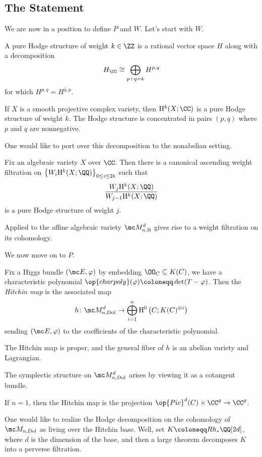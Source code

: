 \documentclass{article}
\begin{document}
\subsection{The Statement}
We are now in a position to define $P$ and $W$. Let's start with $W$.
\begin{definition}
	A pure Hodge structure of weight $k\in\ZZ$ is a rational vector space $H$ along with a decomposition
	\[H_\CC\cong\bigoplus_{p+q=k}H^{p,q}\]
	for which $H^{p,q}=\overline{H^{q,p}}$.
\end{definition}
\begin{example}
	If $X$ is a smooth projective complex variety, then $\mathrm H^k(X;\CC)$ is a pure Hodge structure of weight $k$. The Hodge structure is concentrated in pairs $(p,q)$ where $p$ and $q$ are nonnegative.
\end{example}
One would like to port over this decomposition to the nonabelian setting.
\begin{theorem}[Deligne]
	Fix an algebraic variety $X$ over $\CC$. Then there is a canonical ascending weight filtration on $\left\{W_i\mathrm H^k(X;\QQ)\right\}_{0\le i\le2k}$ such that
	\[\frac{W_j\mathrm H^k(X;\QQ)}{W_{j-1}\mathrm H^k(X;\QQ)}\]
	is a pure Hodge structure of weight $j$.
\end{theorem}
Applied to the affine algebraic variety $\mc M_{n,\mathrm B}^d$ gives rise to a weight filtration on its cohomology.

We now move on to $P$.
\begin{definition}
	Fix a Higgs bundle $(\mc E,\varphi)$ by embedding $\OO_C\subseteq K(C)$, we have a characteristic polynomial $\op{charpoly}(\varphi)\coloneqq\det(T-\varphi)$. Then the \textit{Hitchin map} is the associated map
	\[h\colon\mc M_{n,\mathrm{Dol}}^d\to\bigoplus_{i=1}^n\mathrm H^0\left(C;K(C)^{\otimes i}\right)\]
	sending $(\mc E,\varphi)$ to the coefficients of the characteristic polynomial.
\end{definition}
\begin{theorem}
	The Hitchin map is proper, and the general fiber of $h$ is an abelian variety and Lagrangian.
\end{theorem}
\begin{remark}
	The symplectic structure on $\mc M_{n,\mathrm{Dol}}^d$ arises by viewing it as a cotangent bundle.
\end{remark}
\begin{example}
	If $n=1$, then the Hitchin map is the projection $\op{Pic}^d(C)\times\CC^g\to\CC^g$.
\end{example}
One would like to realize the Hodge decomposition on the cohomology of $\mc M_{n,\mathrm{Dol}}$ as living over the Hitchin base. Well, set $K\coloneqq Rh_*\QQ[2d]$, where $d$ is the dimension of the base, and then a large theorem decomposes $K$ into a perverse filtration.
\end{document}
